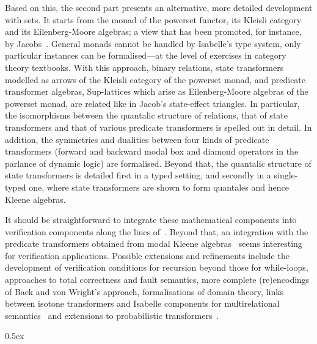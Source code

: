 \documentclass[11pt,a4paper]{article}
\begin{document}
Based on this, the second part presents an alternative, more detailed
development with sets. It starts from the monad of the powerset
functor, its Kleisli category and its Eilenberg-Moore algebras; a view
that has been promoted, for instance, by
Jacobs~\cite{Jacobs17}. General monads cannot be handled by Isabelle's
type system, only particular instances can be formalised---at the
level of exercises in category theory textbooks. With this approach,
binary relations, state transformers modelled as arrows of the Kleisli
category of the powerset monad, and predicate transformer algebras,
Sup-lattices which arise as Eilenberg-Moore algebras of the powerset
monad, are related like in Jacob's state-effect triangles. In
particular, the isomorphisms between the quantalic structure of
relations, that of state transformers and that of various predicate
transformers is spelled out in detail. In addition, the symmetries and
dualities between four kinds of predicate transformers (forward and
backward modal box and diamond operators in the parlance of dynamic
logic) are formalised. Beyond that, the quantalic structure of state
transformers is detailed first in a typed setting, and secondly in a
single-typed one, where state transformers are shown to form quantales
and hence Kleene algebras.

It should be straightforward to integrate these mathematical
components into verification components along the lines
of~\cite{ArmstrongGS16,GomesS16}.  Beyond that, an integration with
the predicate transformers obtained from modal Kleene
algebras~\cite{GomesGHSW16} seems interesting for verification
applications.  Possible extensions and refinements include the
development of verification conditions for recursion beyond those for
while-loops, approaches to total correctness and fault semantics, more
complete (re)encodings of Back and von Wright's approach,
formalisations of domain theory, links between isotone transformers
and Isabelle components for multirelational
semantics~\cite{FurusawaS15} and extensions to probabilistic
transformers~\cite{McIverM05}.

\parindent 0pt\parskip 0.5ex





\end{document}
